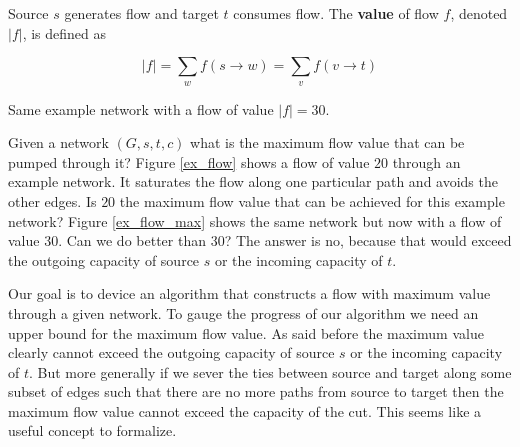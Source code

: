 Source $s$ generates flow and target $t$ consumes flow. The \textbf{value} of flow $f$, denoted $|f|$, is defined as

$$
|f| = \sum_w f(s \rightarrow w) = \sum_v f(v \rightarrow t)
$$

\begin{marginfigure}[0.3in]
    \caption{Same example network with a flow of value $|f| = 30$.}
	\label{ex_flow_max}
\end{marginfigure}

Given a network $(G, s, t, c)$ what is the maximum flow value that can be pumped through it? Figure \ref{ex_flow} shows a flow of value $20$ through an example network. It saturates the flow along one particular path and avoids the other edges. Is $20$ the maximum flow value that can be achieved for this example network? Figure \ref{ex_flow_max} shows the same network but now with a flow of value $30$. Can we do better than $30$? The answer is no, because that would exceed the outgoing capacity of source $s$ or the incoming capacity of $t$. 

Our goal is to device an algorithm that constructs a flow with maximum value through a given network. To gauge the progress of our algorithm we need an upper bound for the maximum flow value. As said before the maximum value clearly cannot exceed the outgoing capacity of source $s$ or the incoming capacity of $t$. But more generally if we sever the ties between source and target along some subset of edges such that there are no more paths from source to target then the maximum flow value cannot exceed the capacity of the cut. This seems like a useful concept to formalize.

